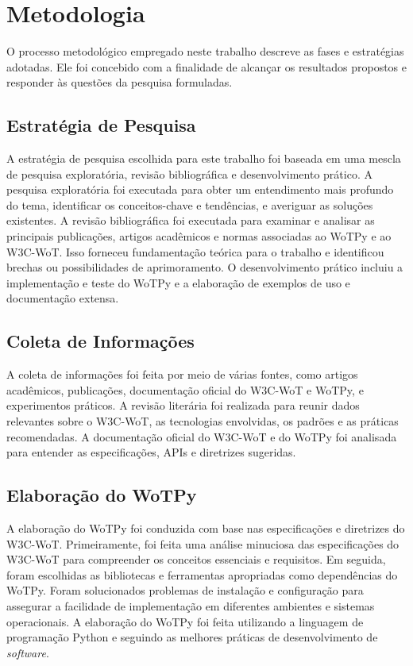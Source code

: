 \chapter{Metodologia}

O processo metodológico empregado neste trabalho descreve as fases e estratégias adotadas. Ele foi concebido com a finalidade de alcançar os resultados propostos e responder às questões da pesquisa formuladas.

\section{Estratégia de Pesquisa}

A estratégia de pesquisa escolhida para este trabalho foi baseada em uma mescla de pesquisa exploratória, revisão bibliográfica e desenvolvimento prático. A pesquisa exploratória foi executada para obter um entendimento mais profundo do tema, identificar os conceitos-chave e tendências, e averiguar as soluções existentes. A revisão bibliográfica foi executada para examinar e analisar as principais publicações, artigos acadêmicos e normas associadas ao WoTPy e ao W3C-WoT. Isso forneceu fundamentação teórica para o trabalho e identificou brechas ou possibilidades de aprimoramento. O desenvolvimento prático incluiu a implementação e teste do WoTPy e a elaboração de exemplos de uso e documentação extensa.

\section{Coleta de Informações}

A coleta de informações foi feita por meio de várias fontes, como artigos acadêmicos, publicações, documentação oficial do W3C-WoT e WoTPy, e experimentos práticos. A revisão literária foi realizada para reunir dados relevantes sobre o W3C-WoT, as tecnologias envolvidas, os padrões e as práticas recomendadas. A documentação oficial do W3C-WoT  e do WoTPy  foi analisada para entender as especificações, APIs e diretrizes sugeridas.

\section{Elaboração do WoTPy}

A elaboração do WoTPy foi conduzida com base nas especificações e diretrizes do W3C-WoT. Primeiramente, foi feita uma análise minuciosa das especificações do W3C-WoT para compreender os conceitos essenciais e requisitos. Em seguida, foram escolhidas as bibliotecas e ferramentas apropriadas como dependências do WoTPy. Foram solucionados problemas de instalação e configuração para assegurar a facilidade de implementação em diferentes ambientes e sistemas operacionais. A elaboração do WoTPy foi feita utilizando a linguagem de programação Python e seguindo as melhores práticas de desenvolvimento de \textit{software}.

